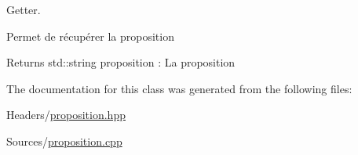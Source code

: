 Getter. 

Permet de récupérer la proposition \begin{DoxyReturn}{Returns}
std\+::string proposition \+: La proposition 
\end{DoxyReturn}


The documentation for this class was generated from the following files\+:\begin{DoxyCompactItemize}
\item 
Headers/\mbox{\hyperlink{proposition_8hpp}{proposition.\+hpp}}\item 
Sources/\mbox{\hyperlink{proposition_8cpp}{proposition.\+cpp}}\end{DoxyCompactItemize}

